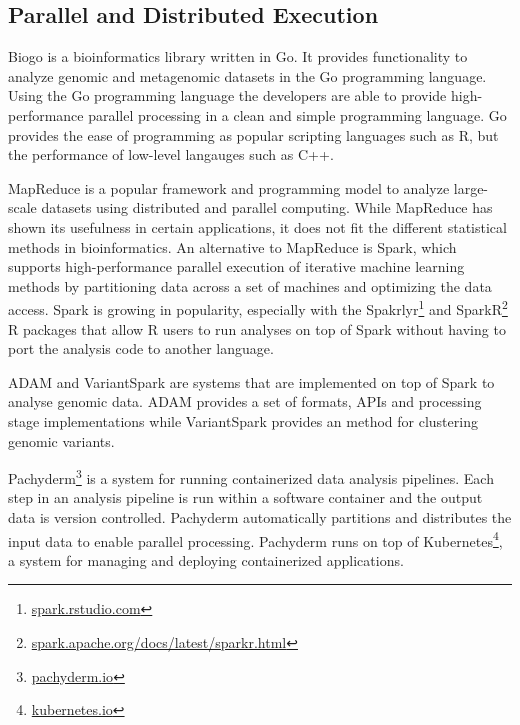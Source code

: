 \subsection*{Parallel and Distributed Execution}
Biogo is a bioinformatics library written in Go. It provides functionality to
analyze genomic and metagenomic datasets in the Go programming
language.\cite{Kortschak005033} Using the Go programming language the developers
are able to provide high-performance parallel processing in a clean and simple
programming language. Go provides the ease of programming as popular scripting
languages such as R, but the performance of low-level langauges such as C++. 

MapReduce is a popular framework and programming model to analyze large-scale
datasets using distributed and parallel computing.\cite{dean2008mapreduce}
While MapReduce has shown its usefulness in certain applications, it does not
fit the different statistical methods in bioinformatics. 
An alternative to MapReduce is Spark, which supports high-performance parallel
execution of iterative machine learning methods by partitioning data across a set
of machines and optimizing the data access.\cite{zaharia2010spark} Spark is
growing in popularity, especially with the
Spakrlyr\footnote{\url{spark.rstudio.com}} and
SparkR\footnote{\url{spark.apache.org/docs/latest/sparkr.html}} R packages that
allow R users to run analyses on top of Spark without having to port the
analysis code to another language. 

ADAM and VariantSpark are systems that are implemented on top of Spark to
analyse genomic data. ADAM provides a set of formats, APIs and processing stage
implementations \cite{massie2013adam} while VariantSpark provides an method for
clustering genomic variants\cite{o2015variantspark}. 

Pachyderm\footnote{\url{pachyderm.io}} is a system for running containerized
data analysis pipelines. Each step in an analysis pipeline is run within a
software container and the output data is version controlled. Pachyderm
automatically partitions and distributes the input data to enable parallel
processing. Pachyderm runs on top of Kubernetes\footnote{\url{kubernetes.io}},
a system for managing and deploying containerized applications. 

